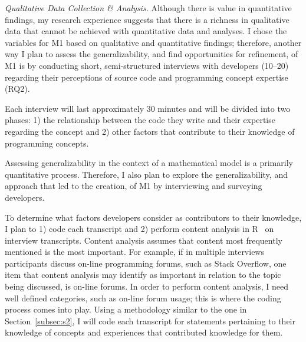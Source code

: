 \documentclass{llncs}
\begin{document}
\vspace{0.5em}

\noindent\textit{Qualitative Data Collection \& Analysis.}
Although there is value in quantitative findings, my research experience suggests that there is a richness in qualitative data that cannot be achieved with quantitative data and analyses.
I chose the variables for M1 based on qualitative and quantitative findings; therefore, another way I plan to assess the generalizability, and find opportunities for refinement, of M1 is by conducting short, semi-structured interviews with developers (10--20) regarding their perceptions of source code and programming concept expertise (RQ2). 

Each interview will last approximately 30 minutes and will be divided into two phases: 1) the relationship between the code they write and their expertise regarding the concept and 2) other factors that contribute to their knowledge of programming concepts.  

Assessing generalizability in the context of a mathematical model is a primarily quantitative process.   Therefore, I also plan to explore the generalizability, and approach that led to the creation, of M1 by interviewing and surveying developers. 

To determine what factors developers consider as contributors to their knowledge, I plan to 1) code each transcript and 2) perform content analysis in R~\cite{RSoftware} on interview transcripts. Content analysis assumes that content most frequently mentioned is the most important. For example, if in multiple interviews participants discuss on-line programming forums, such as Stack Overflow, one item that content analysis may identify as important in relation to the topic being discussed, is on-line forums. In order to perform content analysis, I need well defined categories, such as on-line forum usage; this is where the coding process comes into play. Using a methodology similar to the one in Section~\ref{subsec:s2}, I will code each transcript for statements pertaining to their knowledge of concepts and experiences that contributed knowledge for them. 
\end{document}
